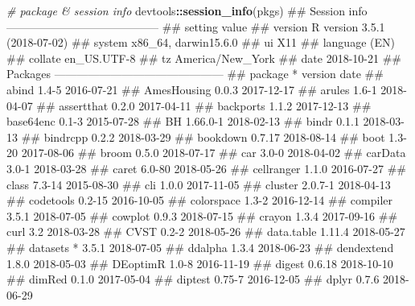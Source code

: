 \documentclass[]{book}
\newenvironment{Shaded}{\begin{snugshade}}{\end{snugshade}}
\newcommand{\CommentTok}[1]{\textcolor[rgb]{0.56,0.35,0.01}{\textit{#1}}}
\newcommand{\KeywordTok}[1]{\textcolor[rgb]{0.13,0.29,0.53}{\textbf{#1}}}
\newcommand{\NormalTok}[1]{#1}
\newcommand{\OperatorTok}[1]{\textcolor[rgb]{0.81,0.36,0.00}{\textbf{#1}}}
\theoremstyle{definition}
\theoremstyle{definition}
\theoremstyle{definition}
\theoremstyle{remark}
\begin{document}
\begin{Shaded}
\begin{Highlighting}[]
\CommentTok{# package & session info}
\NormalTok{devtools}\OperatorTok{::}\KeywordTok{session_info}\NormalTok{(pkgs)}
\NormalTok{## Session info -----------------------------------------}
\NormalTok{##  setting  value                       }
\NormalTok{##  version  R version 3.5.1 (2018-07-02)}
\NormalTok{##  system   x86_64, darwin15.6.0        }
\NormalTok{##  ui       X11                         }
\NormalTok{##  language (EN)                        }
\NormalTok{##  collate  en_US.UTF-8                 }
\NormalTok{##  tz       America/New_York            }
\NormalTok{##  date     2018-10-21}
\NormalTok{## Packages ---------------------------------------------}
\NormalTok{##  package       * version    date      }
\NormalTok{##  abind           1.4-5      2016-07-21}
\NormalTok{##  AmesHousing     0.0.3      2017-12-17}
\NormalTok{##  arules          1.6-1      2018-04-07}
\NormalTok{##  assertthat      0.2.0      2017-04-11}
\NormalTok{##  backports       1.1.2      2017-12-13}
\NormalTok{##  base64enc       0.1-3      2015-07-28}
\NormalTok{##  BH              1.66.0-1   2018-02-13}
\NormalTok{##  bindr           0.1.1      2018-03-13}
\NormalTok{##  bindrcpp        0.2.2      2018-03-29}
\NormalTok{##  bookdown        0.7.17     2018-08-14}
\NormalTok{##  boot            1.3-20     2017-08-06}
\NormalTok{##  broom           0.5.0      2018-07-17}
\NormalTok{##  car             3.0-0      2018-04-02}
\NormalTok{##  carData         3.0-1      2018-03-28}
\NormalTok{##  caret           6.0-80     2018-05-26}
\NormalTok{##  cellranger      1.1.0      2016-07-27}
\NormalTok{##  class           7.3-14     2015-08-30}
\NormalTok{##  cli             1.0.0      2017-11-05}
\NormalTok{##  cluster         2.0.7-1    2018-04-13}
\NormalTok{##  codetools       0.2-15     2016-10-05}
\NormalTok{##  colorspace      1.3-2      2016-12-14}
\NormalTok{##  compiler        3.5.1      2018-07-05}
\NormalTok{##  cowplot         0.9.3      2018-07-15}
\NormalTok{##  crayon          1.3.4      2017-09-16}
\NormalTok{##  curl            3.2        2018-03-28}
\NormalTok{##  CVST            0.2-2      2018-05-26}
\NormalTok{##  data.table      1.11.4     2018-05-27}
\NormalTok{##  datasets      * 3.5.1      2018-07-05}
\NormalTok{##  ddalpha         1.3.4      2018-06-23}
\NormalTok{##  dendextend      1.8.0      2018-05-03}
\NormalTok{##  DEoptimR        1.0-8      2016-11-19}
\NormalTok{##  digest          0.6.18     2018-10-10}
\NormalTok{##  dimRed          0.1.0      2017-05-04}
\NormalTok{##  diptest         0.75-7     2016-12-05}
\NormalTok{##  dplyr           0.7.6      2018-06-29}

\end{Highlighting}
\end{Shaded}
\end{document}

